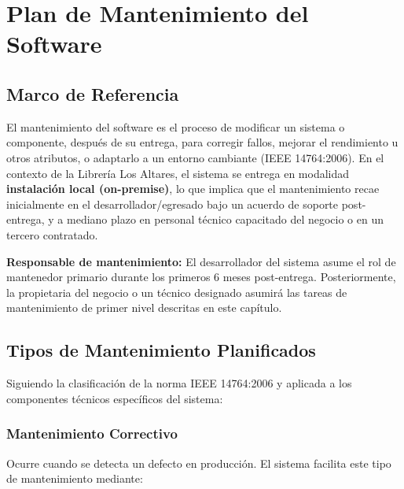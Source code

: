 \documentclass[12pt,a4paper,oneside]{report}
\begin{document}
\chapter{Plan de Mantenimiento del Software}

\section{Marco de Referencia}

El mantenimiento del software es el proceso de modificar un sistema o componente, después de su entrega, para corregir fallos, mejorar el rendimiento u otros atributos, o adaptarlo a un entorno cambiante (IEEE 14764:2006). En el contexto de la Librería Los Altares, el sistema se entrega en modalidad \textbf{instalación local (on-premise)}, lo que implica que el mantenimiento recae inicialmente en el desarrollador/egresado bajo un acuerdo de soporte post-entrega, y a mediano plazo en personal técnico capacitado del negocio o en un tercero contratado.

\begin{infobox}
\textbf{Responsable de mantenimiento:} El desarrollador del sistema asume el rol de mantenedor primario durante los primeros 6 meses post-entrega. Posteriormente, la propietaria del negocio o un técnico designado asumirá las tareas de mantenimiento de primer nivel descritas en este capítulo.
\end{infobox}

\section{Tipos de Mantenimiento Planificados}

Siguiendo la clasificación de la norma IEEE 14764:2006 y aplicada a los componentes técnicos específicos del sistema:

\subsection{Mantenimiento Correctivo}

Ocurre cuando se detecta un defecto en producción. El sistema facilita este tipo de mantenimiento mediante:
\end{document}
